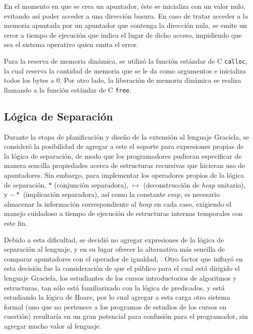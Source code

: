 {{En el momento en que se crea un apuntador, éste se inicializa con un valor nulo,
evitando así poder acceder a una dirección basura. En caso de tratar acceder a
la memoria apuntada por un apuntador que contenga la dirección nula, se emite un
error a tiempo de ejecución que indica el lugar de dicho acceso, impidiendo que
sea el sistema operativo quien emita el error.

Para la reserva de memoria dinámica, se utilizó la función estándar de C
\texttt{calloc}, la cual reserva la cantidad de memoria que se le da como
argumentos e inicializa todos los bytes a $0$. Por otro lado, la liberación de
memoria dinámica se realiza llamando a la función estándar de C \texttt{free}.

\subsection{Lógica de Separación}

Durante la etapa de planificación y diseño de la extensión al lenguaje Graciela,
se consideró la posibilidad de agregar a este el soporte para expresiones
propias de la lógica de separación, de modo que los programadores pudieran
especificar de manera sencilla propiedades acerca de estructuras recursivas que
hicieran uso de apuntadores. Sin embargo, para implementar los operadores
propios de la lógica de separación, $*$ (conjunción separadora), $\mapsto$
(deconstrucción de \textit{heap} unitario), y $-*$ (implicación separadora), así
como la constante $emp$, es necesario almacenar la información correspondiente
al \textit{heap} en cada caso, exigiendo el manejo cuidadoso a tiempo de
ejecución de estructuras internas temporales con este fin.

Debido a esta dificultad, se decidió no agregar expresiones de la lógica de
separación al lenguaje, y en su lugar ofrecer la alternativa más sencilla de
comparar apuntadores con el operador de igualdad, \ingra{==}. Otro factor que
influyó en esta decisión fue la consideración de que el público para el cual
está dirigido el lenguaje Graciela, los estudiantes de los cursos introductorios
de algoritmos y estructuras, tan sólo está familiarizado con la lógica de
predicados, y está estudiando la lógica de Hoare, por lo cual agregar a esta
carga otro sistema formal (uno que no pertenece a los programas de
estudios de los cursos en cuestión) resultaría en un gran potencial para
confusión para el programador, sin agregar mucho valor al lenguaje.


}}
